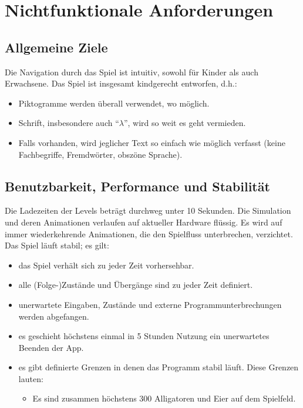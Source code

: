 \section{Nichtfunktionale Anforderungen}

\subsection{Allgemeine Ziele}
\begin{requirements}
	 Die Navigation durch das Spiel ist intuitiv, sowohl für Kinder als auch Erwachsene.
	 Das Spiel ist insgesamt kindgerecht entworfen, d.h.:
		\begin{itemize}
			\item Piktogramme werden überall verwendet, wo möglich.
			\item Schrift, insbesondere auch "`$\lambda$"', wird so weit es geht vermieden.
			\item Falls vorhanden, wird jeglicher Text so einfach wie möglich verfasst (keine Fachbegriffe, Fremdwörter, obszöne Sprache).
		\end{itemize}
\end{requirements}

\subsection{Benutzbarkeit, Performance und Stabilität}
\begin{requirements}
	 Die Ladezeiten der Levels beträgt durchweg unter 10 Sekunden.
	 Die Simulation und deren Animationen verlaufen auf aktueller Hardware flüssig.
	 Es wird auf immer wiederkehrende Animationen, die den Spielfluss unterbrechen, verzichtet.
	 Das Spiel läuft stabil; es gilt:
		\begin{itemize}
			\item das Spiel verhält sich zu jeder Zeit vorhersehbar.
			\item alle (Folge-)Zustände und Übergänge sind zu jeder Zeit definiert.
			\item unerwartete Eingaben, Zustände und externe Programmunterbrechungen werden abgefangen.
			\item es geschieht höchstens einmal in 5 Stunden Nutzung ein unerwartetes Beenden der App.
			\item es gibt definierte Grenzen in denen das Programm stabil läuft. Diese Grenzen lauten:
				\begin{itemize}
					\item Es sind zusammen höchstens 300 Alligatoren und Eier auf dem Spielfeld.
				\end{itemize}
		\end{itemize}
\end{requirements}

